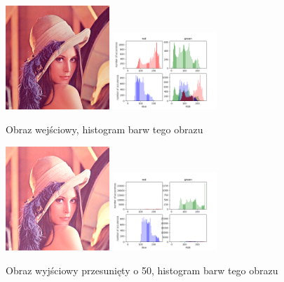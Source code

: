 \documentclass[final,a4paper,openany,12pt]{mwbk}
\begin{document}
\begin{figure}[H]
	\begin{center}
		\includegraphics[width=0.35\textwidth]{lena_color}
		\includegraphics[width=0.35\textwidth]{lena_color_histogram}
	\end{center}
	\caption{Obraz wejściowy, histogram barw tego obrazu}
\end{figure}

\begin{figure}[H]
	\begin{center}
		\includegraphics[width=0.35\textwidth]{lena_color_moveHist_result}
		\includegraphics[width=0.35\textwidth]{lena_color_moveHist_histogram}
	\end{center}
	\caption{Obraz wyjściowy przesunięty o 50, histogram barw tego obrazu}
\end{figure}
\end{document}
